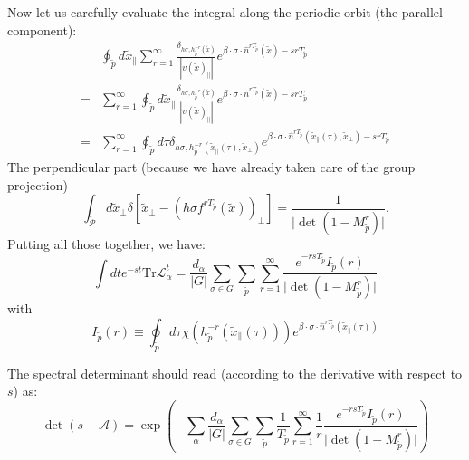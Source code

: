 \begin{description}
Now let us carefully evaluate the integral along the periodic orbit
(the parallel component):
\begin{align*}
 & \oint_{\tilde{p}}d\tilde{x}_{\parallel}\sum_{r=1}^{\infty}\frac{\delta_{h\sigma,h_{\tilde{p}}^{-r}(\tilde{x})}}{\left|v(\tilde{x})_{\parallel}\right|}e^{\beta\cdot\sigma\cdot\hat{n}^{rT_{\tilde{p}}}(\tilde{x})-srT_{\tilde{p}}}\\
= & \sum_{r=1}^{\infty}\oint_{\tilde{p}}d\tilde{x}_{\parallel}\frac{\delta_{h\sigma,h_{\tilde{p}}^{-r}(\tilde{x})}}{\left|v(\tilde{x})_{\parallel}\right|}e^{\beta\cdot\sigma\cdot\hat{n}^{rT_{\tilde{p}}}(\tilde{x})-srT_{\tilde{p}}}\\
= & \sum_{r=1}^{\infty}\oint_{\tilde{p}}d\tau\delta_{h\sigma,h_{\tilde{p}}^{-r}(\tilde{x}_{\parallel}(\tau),\tilde{x}_{\perp})}e^{\beta\cdot\sigma\cdot\hat{n}^{rT_{\tilde{p}}}(\tilde{x}_{\parallel}(\tau),\tilde{x}_{\perp})-srT_{\tilde{p}}}
\end{align*}
The perpendicular part (because we have already taken care of the
group projection) 
\[
\int_{\tilde{\mathcal{P}}}d\tilde{x}_{\perp}\delta\left[\tilde{x}_{\perp}-\left(h\sigma f^{rT_{\tilde{p}}}(\tilde{x})\right)_{\perp}\right]=\frac{1}{\vert\det(1-M_{\tilde{p}}^{r})\vert}.
\]
 Putting all those together, we have:
\[
\int dte^{-st}\mathrm{Tr}\mathcal{L}_{\alpha}^{t}=\frac{d_{\alpha}}{\vert G\vert}\sum_{\sigma\in G}\sum_{\tilde{p}}\sum_{r=1}^{\infty}\frac{e^{-rsT_{\tilde{p}}}I_{\tilde{p}}(r)}{\vert\det(1-M_{\tilde{p}}^{r})\vert}
\]
with
\[
I_{\tilde{p}}(r)\equiv\oint_{\tilde{p}}d\tau \chi( h_{\tilde{p}}^{-r}(\tilde{x}_{\parallel}(\tau)))e^{\beta\cdot\sigma\cdot\hat{n}^{rT_{\tilde{p}}}(\tilde{x}_{\parallel}(\tau))}
\]


The spectral determinant should read (according to the derivative
with respect to $s$) as:
\[
\det(s-\mathcal{A})=\exp\left(-\sum_{\alpha}\frac{d_{\alpha}}{\vert G\vert}\sum_{\sigma\in G}\sum_{\tilde{p}}\frac{1}{T_{\tilde{p}}}\sum_{r=1}^{\infty}\frac{1}{r}\frac{e^{-rsT_{\tilde{p}}}I_{\tilde{p}}(r)}{\vert\det(1-M_{\tilde{p}}^{r})\vert}\right)
\]



\end{description}
